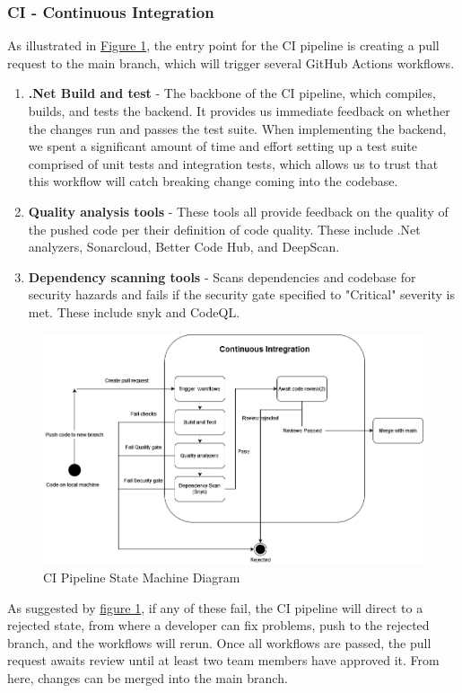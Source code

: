 \subsubsection{CI - Continuous Integration}
\label{subsubsec:ci}
As illustrated in \hyperref[fig:CIStateMachine]{Figure 1}, the entry point for the CI pipeline is creating a pull request to the main branch, which will trigger several GitHub Actions workflows.
\begin{enumerate}
    \item \textbf{.Net Build and test} - The backbone of the CI pipeline, which compiles, builds, and tests the backend. It provides us immediate feedback on whether the changes run and passes the test suite. When implementing the backend, we spent a significant amount of time and effort setting up a test suite comprised of unit tests and integration tests, which allows us to trust that this workflow will catch breaking change coming into the codebase.
    \item \textbf{Quality analysis tools} - These tools all provide feedback on the quality of the pushed code per their definition of code quality. These include .Net analyzers, Sonarcloud, Better Code Hub, and DeepScan.
    \item \textbf{Dependency scanning tools} - Scans dependencies and codebase for security hazards and fails if the security gate specified to "Critical" severity is met. These include snyk and CodeQL.
\end{enumerate}


\begin {figure}[H]
    \centering
    \includegraphics[scale=0.50]{images/ci_cd_diagrams/DevopsDiagrams-StateMachine CI.drawio(4).png}
    \caption{CI Pipeline State Machine Diagram}
    \label{fig:CIStateMachine}
\end{figure}
As suggested by \hyperref[fig:CIStateMachine]{figure 1}, if any of these fail, the CI pipeline will direct to a rejected state, from where a developer can fix problems, push to the rejected branch, and the workflows will rerun. Once all workflows are passed, the pull request awaits review until at least two team members have approved it. From here, changes can be merged into the main branch.

